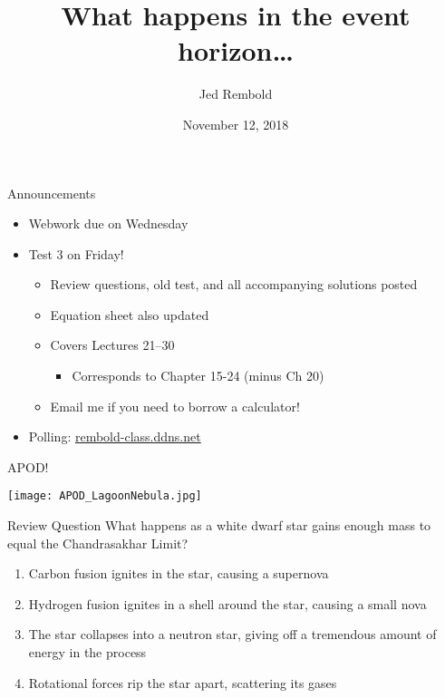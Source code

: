 \documentclass[pdf, aspectratio=169]{beamer}
\title{What happens in the event horizon\ldots}
\date{November 12, 2018}
\author{Jed Rembold}
\begin{document}
\renewcommand*{\theenumi}{\Alph{enumi}}

\begin{frame}{Announcements}
  \begin{itemize}
	\item Webwork due on Wednesday
	\item Test 3 on Friday!
	  \begin{itemize}
		\item Review questions, old test, and all accompanying solutions posted
		\item Equation sheet also updated
		\item Covers Lectures 21--30
			\begin{itemize}
				\item Corresponds to Chapter 15-24 (minus Ch 20)
			\end{itemize}
		\item Email me if you need to borrow a calculator!
	  \end{itemize}
	\item Polling: \url{rembold-class.ddns.net}
  \end{itemize}
\end{frame}

\begin{frame}{APOD!}
	\begin{center}
		\texttt{[image: APOD\_LagoonNebula.jpg]}
	\end{center}
\end{frame}

\begin{frame}{Review Question}
  What happens as a white dwarf star gains enough mass to equal the Chandrasakhar Limit?
  \begin{enumerate}
	\item \alert<2>{Carbon fusion ignites in the star, causing a supernova}
	\item Hydrogen fusion ignites in a shell around the star, causing a small nova
	\item The star collapses into a neutron star, giving off a tremendous amount of energy in the process
	\item Rotational forces rip the star apart, scattering its gases
  \end{enumerate}
\end{frame}
\end{document}

